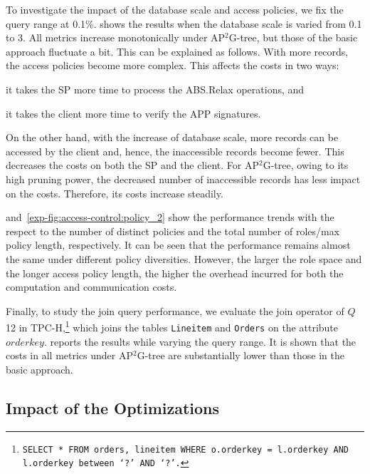 To investigate the impact of the database scale and access policies, we fix the query range at 0.1\%.  shows the results when the database scale is varied from 0.1 to 3. All metrics increase monotonically under AP$^2$G-tree, but those of the basic approach fluctuate a bit. This can be explained as follows. With more records, the access policies become more complex. This affects the costs in two ways:
\begin{inlineenum}
    \item it takes the SP more time to process the \textsf{ABS.Relax} operations, and
    \item it takes the client more time to verify the APP signatures.
\end{inlineenum}
On the other hand, with the increase of database scale, more records can be accessed by the client and, hence, the inaccessible records become fewer. This decreases the costs on both the SP and the client.
For AP$^2$G-tree, owing to its high pruning power, the decreased number of inaccessible records has less impact on the costs. Therefore, its costs increase steadily.

 and~\cref{exp-fig:access-control:policy_2} show the performance trends with the respect to the number of distinct policies and the total number of roles/max policy length, respectively. It can be seen that the performance remains almost the same under different policy diversities. However, the larger the role space and the longer access policy length, the higher the overhead incurred for both the computation and communication costs.

Finally, to study the join query performance, we evaluate the join operator of $Q$12 in TPC-H,\footnote{\texttt{SELECT * FROM orders, lineitem WHERE o.orderkey = l.orderkey AND l.orderkey between `?' AND `?'.}} which joins the tables \texttt{Lineitem} and \texttt{Orders} on the attribute $orderkey$.  reports the results while varying the query range. It is shown that the costs in all metrics under AP$^2$G-tree are substantially lower than those in the basic approach.

\subsection{Impact of the Optimizations}

